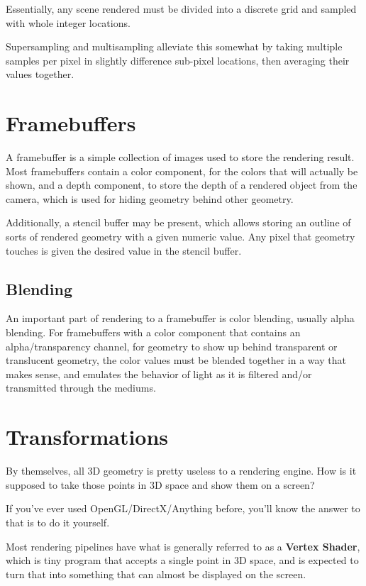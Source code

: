 \documentclass[12pt,letterpaper]{article}
\begin{document}
Essentially, any scene rendered must be divided into a discrete grid and sampled with whole integer locations.

Supersampling and multisampling alleviate this somewhat by taking multiple samples per pixel in 
slightly difference sub-pixel locations, then averaging their values together.

\section{Framebuffers}

A framebuffer is a simple collection of images used to store the rendering result. Most framebuffers contain a color
component, for the colors that will actually be shown, and a depth component, to store the depth of a rendered object from the camera,
which is used for hiding geometry behind other geometry.

Additionally, a stencil buffer may be present, which allows storing an outline of sorts 
of rendered geometry with a given numeric value. Any pixel that geometry touches is given the desired value
in the stencil buffer.

\subsection{Blending}

An important part of rendering to a framebuffer is color blending, usually alpha blending. 
For framebuffers with a color component that contains an alpha/transparency channel, for geometry to show up behind 
transparent or translucent geometry, the color values must be blended together in a way that makes sense, and emulates
the behavior of light as it is filtered and/or transmitted through the mediums.

\section{Transformations}

By themselves, all 3D geometry is pretty useless to a rendering engine. How is it supposed to take those points in 3D
space and show them on a screen?

If you've ever used OpenGL/DirectX/Anything before, you'll know the answer to that is to do it yourself.

Most rendering pipelines have what is generally referred to as a \textbf{Vertex Shader}, which is tiny program that
accepts a single point in 3D space, and is expected to turn that into something that can almost be displayed on the screen.
\end{document}
